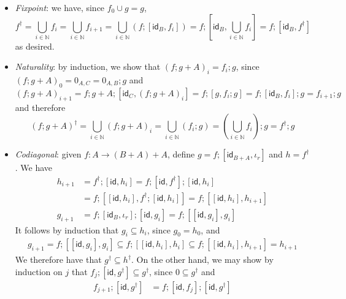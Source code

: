 \documentclass[acmsmall,screen,anonymous,review]{acmart}
\newcommand{\ms}[1]{\ensuremath{\mathsf{#1}}}
\newcommand{\nats}{\mathbb{N}}
\begin{document}
\begin{itemize}
  \item \emph{Fixpoint}: we have, since $f_0 \cup g = g$,
  \begin{equation*}
    f^\dagger = \bigcup_{i \in \nats}f_i 
               = \bigcup_{i \in \nats}f_{i + 1} 
               = \bigcup_{i \in \nats}(f ; [\ms{id}_B, f_i]) 
               = f ; [\ms{id}_B, \bigcup_{i \in \nats}f_i] 
               = f ; [\ms{id}_B, f^\dagger]
  \end{equation*}
  as desired.
  \item \emph{Naturality}: by induction, we show that $(f ; g + A)_i = f_i ; g$, since 
  $(f ; g + A)_0 = 0_{A, C} = 0_{A, B} ; g$ and
  \begin{equation*}
    (f ; g + A)_{i + 1} = f ; g + A ; [\ms{id}_C, (f ; g + A)_i] 
                        = f ; [g, f_i ; g] = f ; [\ms{id}_B, f_i] ; g = f_{i + 1} ; g
  \end{equation*}
  and therefore
  \begin{equation*}
  (f ; g + A)^\dagger = \bigcup_{i \in \nats}(f ; g + A)_i
  = \bigcup_{i \in \nats}(f_i ; g)
  = (\bigcup_{i \in \nats}f_i) ; g
  = f^\dagger ; g
  \end{equation*}
  \item \emph{Codiagonal}: given $f: A \to (B + A) + A$, define $g = f ; [\ms{id}_{B + A}, \iota_r]$
  and $h = f^\dagger$. We have
  \begin{align*}
    h_{i + 1}
    & = f^\dagger ; [\ms{id}, h_i]
      = f ; [\ms{id}, f^\dagger] ; [\ms{id}, h_i] \\
    & = f ; [[\ms{id}, h_i], f^\dagger ; [\ms{id}, h_i]]
      = f ; [[\ms{id}, h_i], h_{i + 1}] \\
    g_{i + 1} 
    & = f ; [\ms{id}_B, \iota_r] ; [\ms{id}, g_i] 
      = f ; [[\ms{id}, g_i], g_i]
  \end{align*}
  It follows by induction that $g_i \subseteq h_i$, since $g_0 = h_0$, and
  \begin{align*}
  g_{i + 1} 
  = f ; [[\ms{id}, g_i], g_i]
  \subseteq f ; [[\ms{id}, h_i], h_i]
  \subseteq f ; [[\ms{id}, h_i], h_{i + 1}]
  = h_{i + 1}
  \end{align*}
  We therefore have that $g^\dagger \subseteq h^\dagger$. On the other hand, we may show by
  induction on $j$ that $f_j ; [\ms{id}, g^\dagger] \subseteq g^\dagger$, since $0 \subseteq
  g^\dagger$ and
  \begin{align*}
  f_{j + 1} ; [\ms{id}, g^\dagger] 
  & = f ; [\ms{id}, f_j] ; [\ms{id}, g^\dagger]

\end{align*}
\end{itemize}
\end{document}
